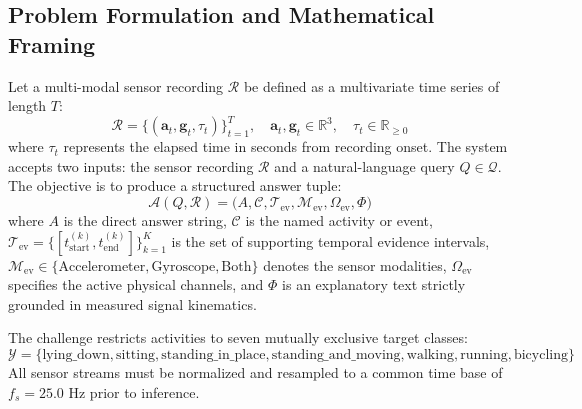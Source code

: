 \documentclass[11pt,a4paper]{article}
\begin{document}
\subsection{Problem Formulation and Mathematical Framing}
Let a multi-modal sensor recording $\mathcal{R}$ be defined as a multivariate time series of length $T$:
\begin{equation}
  \mathcal{R} = \{ (\mathbf{a}_t, \mathbf{g}_t, \tau_t) \}_{t=1}^{T}, \quad \mathbf{a}_t, \mathbf{g}_t \in \mathbb{R}^3, \quad \tau_t \in \mathbb{R}_{\ge 0}
\end{equation}
where $\tau_t$ represents the elapsed time in seconds from recording onset. The system accepts two inputs: the sensor recording $\mathcal{R}$ and a natural-language query $Q \in \mathcal{Q}$. The objective is to produce a structured answer tuple:
\begin{equation}
  \mathcal{A}(Q, \mathcal{R}) = \big( A, \mathcal{C}, \mathcal{T}_{\text{ev}}, \mathcal{M}_{\text{ev}}, \Omega_{\text{ev}}, \Phi \big)
\end{equation}
where $A$ is the direct answer string, $\mathcal{C}$ is the named activity or event, $\mathcal{T}_{\text{ev}} = \{ [t_{\text{start}}^{(k)}, t_{\text{end}}^{(k)}] \}_{k=1}^K$ is the set of supporting temporal evidence intervals, $\mathcal{M}_{\text{ev}} \in \{\text{Accelerometer}, \text{Gyroscope}, \text{Both}\}$ denotes the sensor modalities, $\Omega_{\text{ev}}$ specifies the active physical channels, and $\Phi$ is an explanatory text strictly grounded in measured signal kinematics.

The challenge restricts activities to seven mutually exclusive target classes:
\begin{equation}
  \mathcal{Y} = \{\text{lying\_down}, \text{sitting}, \text{standing\_in\_place}, \text{standing\_and\_moving}, \text{walking}, \text{running}, \text{bicycling}\}
\end{equation}
All sensor streams must be normalized and resampled to a common time base of $f_s = 25.0\text{ Hz}$ prior to inference.
\end{document}

